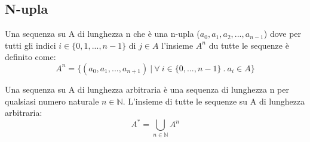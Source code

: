 \subsection{N-upla}
\begin{definition}[N-upla]
Una sequenza su A di lunghezza n che è una n-upla ($a_0, a_1, a_2, ...,a_{n-1}$) dove per tutti gli indici $i \in \{0,1,...,n-1\}$ di $j \in A$ l'insieme $A^n$ du tutte le sequenze è definito come:
\begin{equation}
    A^n = \{(a_0,a_1, ..., a_{n+1}) \:|\: \forall \: i \in \{0,...,n-1\}\:.\: a_i \in A\}
\end{equation}
\end{definition}

\begin{definition}
Una sequenza su A di lunghezza arbitraria è una sequenza di lunghezza n per qualsiasi numero naturale $n \in \mathbb{N}$. L'insieme di tutte le sequenze su A di lunghezza arbitraria:
\[A^* = \bigcup_{n\in \mathbb{N}} A^n\]
\end{definition}